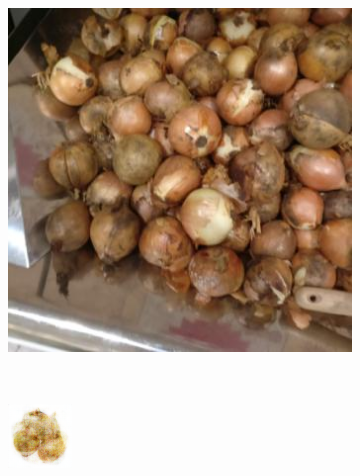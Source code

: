 \begin{figure}[t]
\begin{subfigure}[b]{0.18\textwidth}
		\caption{}
		\label{subfig:orange-decoded}
	\end{subfigure} \\[1mm]
	\begin{subfigure}[b]{0.18\textwidth}
		\centering
		\includegraphics[width=\textwidth]{PaperA/decoded-image-figure/Yellow-Onion_030.jpg}
		\caption{}
		\label{subfig:onion-natural}
	\end{subfigure} ~
	\begin{subfigure}[b]{0.18\textwidth}
		\centering
		\includegraphics[width=\textwidth]{PaperA/decoded-image-figure/densenet_nov11/Yellow-Onion_decoded.png}

\end{subfigure}
\end{figure}
